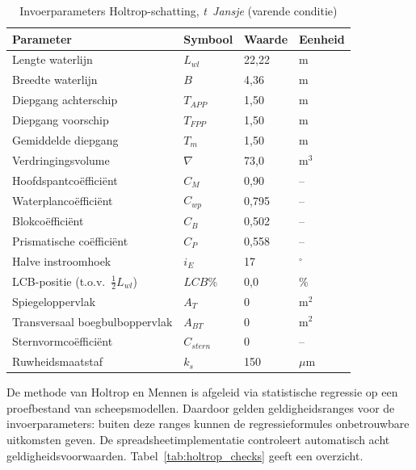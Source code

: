 \begin{table}[H]
\centering
\caption{Invoerparameters Holtrop-schatting, \emph{t~Jansje} (varende conditie)}
\label{tab:holtrop_input}
\begin{tabular}{llll}
\toprule
Parameter & Symbool & Waarde & Eenheid \\
\midrule
Lengte waterlijn                            & $L_{wl}$     & 22{,}22 & m        \\
Breedte waterlijn                           & $B$          &  4{,}36 & m        \\
Diepgang achterschip                        & $T_{APP}$    &  1{,}50 & m        \\
Diepgang voorschip                          & $T_{FPP}$    &  1{,}50 & m        \\
Gemiddelde diepgang                         & $T_m$        &  1{,}50 & m        \\
Verdringingsvolume                          & $\nabla$     & 73{,}0  & m$^3$    \\
Hoofdspantcoëfficiënt                       & $C_M$        &  0{,}90 & –        \\
Waterplancoëfficiënt                        & $C_{wp}$     &  0{,}795& –        \\
Blokcoëfficiënt                             & $C_B$        &  0{,}502& –        \\
Prismatische coëfficiënt                    & $C_P$        &  0{,}558& –        \\
Halve instroomhoek                          & $i_E$        & 17      & $^\circ$ \\
LCB-positie (t.o.v.\ $\tfrac{1}{2}L_{wl}$) & $LCB$\%     &  0{,}0  & \%       \\
Spiegeloppervlak                            & $A_T$        & 0       & m$^2$    \\
Transversaal boegbulboppervlak              & $A_{BT}$     & 0       & m$^2$    \\
Sternvormcoëfficiënt                        & $C_{stern}$  & 0       & –        \\
Ruwheidsmaatstaf                            & $k_s$        & 150     & $\mu$m   \\
\bottomrule
\end{tabular}
\end{table}
 
De methode van Holtrop en Mennen is afgeleid via statistische regressie op een proefbestand
van scheepsmodellen. Daardoor gelden geldigheidsranges voor de invoerparameters: buiten deze
ranges kunnen de regressieformules onbetrouwbare uitkomsten geven.
De spreadsheetimplementatie \cite{spreadsheet_holtrop} controleert automatisch acht
geldigheidsvoorwaarden. Tabel~\ref{tab:holtrop_checks} geeft een overzicht.
 
